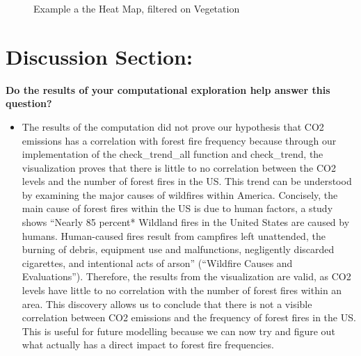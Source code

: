\documentclass[fontsize=11pt]{article}
\begin{document}
\begin{enumerate}
\begin{figure}[h]
            \caption{Example a the Heat Map, filtered on Vegetation}
            \label{fig:my_label}
        \end{figure}
\end{enumerate}

\pagebreak   

\section*{Discussion Section:}
\textbf{Do the results of your computational exploration help answer this question?}
    
\begin{itemize}
\item The results of the computation did not prove our hypothesis that CO2 emissions has a correlation with forest fire frequency because through our implementation of the check\_trend\_all function and check\_trend, the visualization proves that there is little to no correlation between the CO2 levels and the number of forest fires in the US. This trend can be understood by examining the major causes of wildfires within America. Concisely, the main cause of forest fires within the US is due to human factors, a study shows “Nearly 85 percent* Wildland fires in the United States are caused by humans. Human-caused fires result from campfires left unattended, the burning of debris, equipment use and malfunctions, negligently discarded cigarettes, and intentional acts of arson” (“Wildfire Causes and Evaluations”). Therefore, the results from the visualization are valid, as CO2 levels have little to no correlation with the number of forest fires within an area. This discovery allows us to conclude that there is not a visible correlation between CO2 emissions and the frequency of forest fires in the US. This is useful for future modelling because we can now try and figure out what actually has a direct impact to forest fire frequencies.
\end{itemize}
\end{document}
